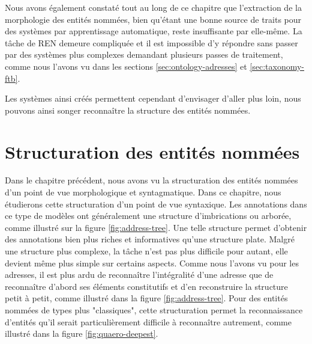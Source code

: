 \documentclass[12pt,a4paper,times,twoside,openright]{report}
\begin{document}
Nous avons également constaté tout au long de ce chapitre que l'extraction de la morphologie des entités nommées, bien qu'étant une bonne source de traits pour des systèmes par apprentissage automatique, reste insuffisante par elle-même. La tâche de REN demeure compliquée et il est impossible d'y répondre sans passer par des systèmes plus complexes demandant plusieurs passes de traitement, comme nous l'avons vu dans les sections \ref{sec:ontology-adresses} et \ref{sec:taxonomy-ftb}.

Les systèmes ainsi créés permettent cependant d'envisager d'aller plus loin, nous pouvons ainsi songer reconnaître la structure des entités nommées.


    

\chapter{Structuration des entités nommées}
\label{chap:structured-NER}
\minitoc
Dans le chapitre précédent, nous avons vu la structuration des entités nommées d'un point de vue morphologique et syntagmatique. Dans ce chapitre, nous étudierons cette structuration d'un point de vue syntaxique. Les annotations dans ce type de modèles ont généralement une structure d'imbrications ou arborée, comme illustré sur la figure \ref{fig:address-tree}. Une telle structure permet d'obtenir des annotations bien plus riches et informatives qu'une structure plate. Malgré une structure plus complexe, la tâche n'est pas plus difficile pour autant, elle devient même plus simple sur certains aspects. Comme nous l'avons vu pour les adresses, il est plus ardu de reconnaître l'intégralité d'une adresse que de reconnaître d'abord ses éléments constitutifs et d'en reconstruire la structure petit à petit, comme illustré dans la figure \ref{fig:address-tree}. Pour des entités nommées de types plus "classiques", cette structuration permet la reconnaissance d'entités qu'il serait particulièrement difficile à reconnaître autrement, comme illustré dans la figure \ref{fig:quaero-deepest}.
\end{document}
